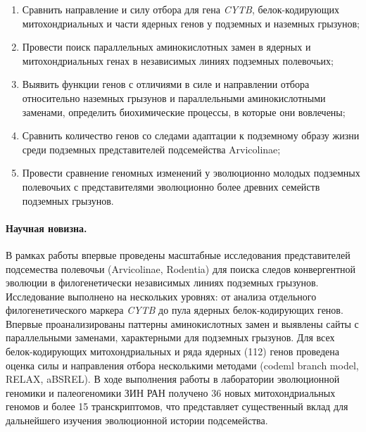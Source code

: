 \begin{enumerate}
	\item Сравнить направление и силу отбора для гена \textit{CYTB}, белок-кодирующих митохондриальных и части ядерных генов у подземных и наземных грызунов;
	\item Провести поиск параллельных аминокислотных замен в ядерных и митохондриальных генах в независимых линиях подземных полевочьих;
	\item Выявить функции генов с отличиями в силе и направлении отбора относительно наземных грызунов и параллельными аминокислотными заменами, определить биохимические процессы, в которые они вовлечены;
	\item Сравнить количество генов со следами адаптации к подземному образу жизни среди подземных представителей подсемейства Arvicolinae;
	\item Провести сравнение геномных изменений у эволюционно молодых подземных полевочьих с представителями эволюционно более древних семейств подземных грызунов. 
\end{enumerate}

\paragraph{Научная новизна.} В рамках работы впервые проведены масштабные исследования представителей подсемества полевочьи (Arvicolinae, Rodentia) для поиска следов конвергентной эволюции в филогенетически независимых линиях подземных грызунов. Исследование выполнено на нескольких уровнях: от анализа отдельного филогенетического маркера \textit{CYTB} до пула ядерных белок-кодирующих генов. Впервые проанализированы паттерны аминокислотных замен и выявлены сайты с параллельными заменами, характерными для подземных грызунов. Для всех белок-кодирующих митохондриальных и ряда ядерных (112) генов проведена оценка силы и направления отбора несколькими методами (codeml branch model, RELAX, aBSREL). В ходе выполнения работы в лаборатории эволюционной геномики и палеогеномики ЗИН РАН получено 36 новых митохондриальных геномов и более 15 транскриптомов, что представляет существенный вклад для дальнейшего изучения эволюционной истории подсемейства. 

